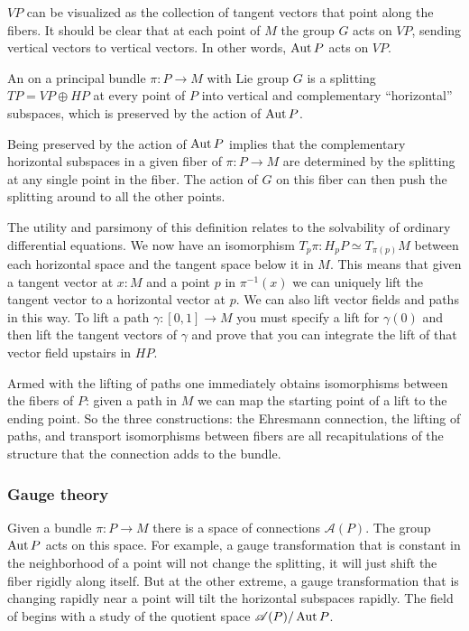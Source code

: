 \( VP \) can be visualized as the collection of tangent vectors that point along the fibers. It should be clear that at each point of \( M \) the group \( G \) acts on \( VP \), sending vertical vectors to vertical vectors. In other words, \( \operatorname{Aut} P \) acts on \( VP \).

\begin{mydef}
An  on a principal bundle \( \pi:P\to M \) with Lie group \( G \) is a splitting \( TP=VP\oplus HP \) at every point of \( P \) into vertical and complementary ``horizontal'' subspaces, which is preserved by the action of \( \operatorname{Aut} P \).
\end{mydef}

Being preserved by the action of \( \operatorname{Aut} P \) implies that the complementary horizontal subspaces in a given fiber of \( \pi:P\to M \) are determined by the splitting at any single point in the fiber. The action of \( G \) on this fiber can then push the splitting around to all the other points.

The utility and parsimony of this definition relates to the solvability of ordinary differential equations. We now have an isomorphism \( T_p\pi:H_pP\simeq T_{\pi(p)}M \) between each horizontal space and the tangent space below it in \( M \). This means that given a tangent vector at \( x:M \) and a point \( p \) in \( \pi^{-1}(x) \) we can uniquely lift the tangent vector to a horizontal vector at \( p \). We can also lift vector fields and paths in this way. To lift a path \( \gamma:[0,1]\to M \) you must specify a lift for \( \gamma(0) \) and then lift the tangent vectors of \( \gamma \) and prove that you can integrate the lift of that vector field upstairs in \( HP \).

Armed with the lifting of paths one immediately obtains isomorphisms between the fibers of \( P \): given a path in \( M \) we can map the starting point of a lift to the ending point. So the three constructions: the Ehresmann connection, the lifting of paths, and transport isomorphisms between fibers are all recapitulations of the structure that the connection adds to the bundle.

\subsubsection{Gauge theory}

Given a bundle \( \pi:P\to M \) there is a space of connections \( \mathscr{A}(P) \). The group \( \operatorname{Aut} P \) acts on this space. For example, a gauge transformation that is constant in the neighborhood of a point will not change the splitting, it will just shift the fiber rigidly along itself. But at the other extreme, a gauge transformation that is changing rapidly near a point will tilt the horizontal subspaces rapidly. The field of  begins with a study of the quotient space \( \mathscr{A}(P)/\operatorname{Aut} P \).

